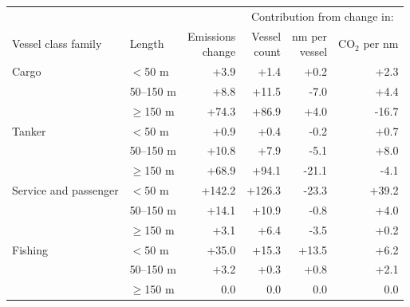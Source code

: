 \documentclass[lineno,pdflatex,sn-nature]{sn-jnl}
\providecommand{\DIFaddbegin}{} %
\providecommand{\DIFaddend}{} %
\providecommand{\DIFaddbeginFL}{} %
\providecommand{\DIFaddendFL}{} %
\providecommand{\DIFdelendFL}{} %
\providecommand{\DIFaddincludegraphics}[2][]{{\color{blue}\fbox{\DIFOincludegraphics[#1]{#2}}}} %
\DeclareRobustCommand{\DIFaddbegin}{\DIFOaddbegin \let\includegraphics\DIFaddincludegraphics} %
\DeclareRobustCommand{\DIFaddend}{\DIFOaddend \let\includegraphics\DIFOincludegraphics} %
\DeclareRobustCommand{\DIFaddbeginFL}{\DIFOaddbeginFL \let\includegraphics\DIFaddincludegraphics} %
\DeclareRobustCommand{\DIFaddendFL}{\DIFOaddendFL \let\includegraphics\DIFOincludegraphics} %
\DeclareRobustCommand{\DIFdelendFL}{\DIFOaddendFL \let\includegraphics\DIFOincludegraphics} %
\begin{document}
\begin{table}[!h]
\DIFdelendFL \DIFaddbeginFL \fontsize{7}{9}\selectfont
\setlength{\tabcolsep}{3pt}
\begin{tabular}[t]{llrrrr}
\toprule
\multicolumn{3}{c}{ } & \multicolumn{3}{c}{Contribution from change in:} \\
\cmidrule(l{3pt}r{3pt}){4-6}
Vessel class family & Length & \shortstack{Emissions\\change} & \shortstack{Vessel\\count} & \shortstack{nm per\\vessel} & \shortstack{CO$_{2}$\\per nm}\\
\midrule
Cargo & $<$50 m & +3.9 & +1.4 & +0.2 & +2.3\\
 & 50--150 m & +8.8 & +11.5 & -7.0 & +4.4\\
 & $\geq$150 m & +74.3 & +86.9 & +4.0 & -16.7\\
\addlinespace
Tanker & $<$50 m & +0.9 & +0.4 & -0.2 & +0.7\\
 & 50--150 m & +10.8 & +7.9 & -5.1 & +8.0\\
 & $\geq$150 m & +68.9 & +94.1 & -21.1 & -4.1\\
\addlinespace
Service and passenger & $<$50 m & +142.2 & +126.3 & -23.3 & +39.2\\
 & 50--150 m & +14.1 & +10.9 & -0.8 & +4.0\\
 & $\geq$150 m & +3.1 & +6.4 & -3.5 & +0.2\\
\addlinespace
Fishing & $<$50 m & +35.0 & +15.3 & +13.5 & +6.2\\
 & 50--150 m & +3.2 & +0.3 & +0.8 & +2.1\\
 & $\geq$150 m & 0.0 & 0.0 & 0.0 & 0.0\\
\bottomrule
\end{tabular}
\DIFaddendFL \end{table}
\DIFaddbegin \FloatBarrier
\DIFaddend 
\end{document}
